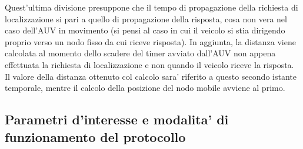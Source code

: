 Quest'ultima divisione presuppone che il tempo di propagazione della richiesta di localizzazione si pari a quello di propagazione della risposta, cosa non vera nel caso dell'AUV in movimento (si pensi al caso in cui il veicolo si stia dirigendo proprio verso un nodo fisso da cui riceve risposta).\newline
In aggiunta, la distanza viene calcolata al momento dello scadere del timer avviato dall'AUV non appena effettuata la richiesta di localizzazione e non quando il veicolo riceve la risposta.
Il valore della distanza ottenuto col calcolo sara' riferito a questo secondo istante temporale, mentre il calcolo della posizione del nodo mobile avviene al primo.

\subsection{Parametri d'interesse e modalita' di funzionamento del protocollo}
